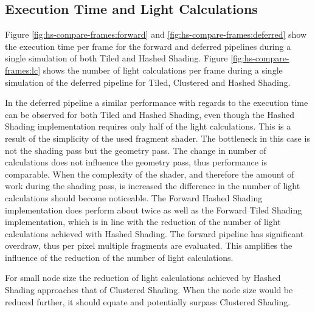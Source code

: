 
\subsection{Execution Time and Light Calculations}

Figure \ref{fig:hs-compare-frames:forward} and \ref{fig:hs-compare-frames:deferred} show the
execution time per frame for the forward and deferred pipelines
during a single simulation of both Tiled and Hashed Shading. Figure \ref{fig:hs-compare-frames:lc}
shows the number of light calculations per frame during a single simulation of the deferred pipeline for
Tiled, Clustered and Hashed Shading.

In the deferred pipeline a similar performance with regards to the execution time can be observed for
both Tiled and Hashed Shading, even though the Hashed Shading implementation requires only
half of the light calculations. This is a result of the simplicity of the used fragment shader.
The bottleneck in this case is not the shading pass but the geometry pass. The change in number
of calculations does not influence the geometry pass, thus performance is comparable. When
the complexity of the shader, and therefore the amount of work during the shading pass, is
increased the difference in the number of light calculations should become noticeable.
The Forward Hashed Shading implementation does perform about twice as well as the Forward
Tiled Shading implementation, which is in line with the reduction of the number of light
calculations achieved with Hashed Shading. The forward pipeline has significant overdraw,
thus per pixel multiple fragments are evaluated. This amplifies the influence of the
reduction of the number of light calculations.

For small node size the reduction of light calculations achieved by Hashed Shading approaches
that of Clustered Shading. When the node size would be reduced further, it should equate
and potentially surpass Clustered Shading.


